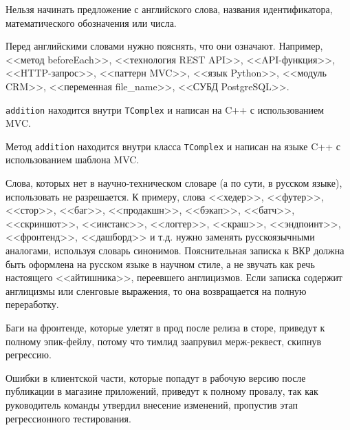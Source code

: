 \documentclass[14pt]{extarticle}
\begin{document}
Нельзя начинать предложение с английского слова, названия идентификатора, математического обозначения или числа.

Перед английскими словами нужно пояснять, что они означают.
Например, <<метод beforeEach>>, <<технология REST API>>, <<API-функция>>, <<HTTP-запрос>>, <<паттерн MVC>>, <<язык Python>>, <<модуль CRM>>, <<переменная file\_name>>, <<СУБД Postgre\-SQL>>.
\begin{tcolorbox}[colback=red!10, colframe=red!50!black, title={Пример неграмотно построенного предложения}]
	\par \texttt{addition} находится внутри \texttt{TComplex} и написан на C++ с использованием MVC.
\end{tcolorbox}
\begin{tcolorbox}[title={Пример грамотно построенного предложения}]
	\par Метод \texttt{addition} находится внутри класса \texttt{TComplex} и написан на языке C++ с использованием шаблона MVC.
\end{tcolorbox}

Слова, которых нет в научно-техническом словаре (а по сути, в русском языке), использовать не разрешается. К примеру, слова <<хедер>>, <<футер>>, <<стор>>, <<баг>>, <<продакшн>>, <<бэкап>>, <<батч>>, <<скриншот>>, <<инстанс>>, <<логгер>>, <<краш>>, <<эндпоинт>>, <<фронтенд>>, <<дашборд>> и т.д.  нужно заменять русскоязычными аналогами, используя словарь синонимов. Пояснительная записка к ВКР должна быть оформлена на русском языке в научном стиле, а не звучать как речь настоящего <<айтишника>>, переевшего англицизмов. Если записка содержит англицизмы или сленговые выражения, то она возвращается на полную переработку.

\begin{tcolorbox}[colback=red!10, colframe=red!50!black, title={Пример неграмотно построенного предложения}]
	\par Баги на фронтенде, которые улетят в прод после релиза в сторе, приведут к полному эпик-фейлу, потому что тимлид заапрувил мерж-реквест, скипнув регрессию.
\end{tcolorbox}
\begin{tcolorbox}[title={Пример грамотно построенного предложения}]
	\par Ошибки в клиентской части, которые попадут в рабочую версию после публикации в магазине приложений, приведут к полному провалу, так как руководитель команды утвердил внесение изменений, пропустив этап регрессионного тестирования.
\end{tcolorbox}
\end{document}
